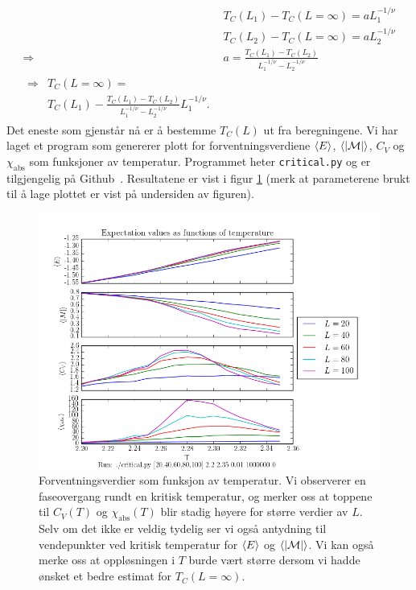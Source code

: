 \documentclass[11pt, twocolumn]{article}
\newcommand{\abs}[1]{|#1|}
\begin{document}
\begin{align}
  &T_C(L_1) - T_C(L=\infty) = aL_1^{-1/\nu}\\
  &T_C(L_2) - T_C(L=\infty) = aL_2^{-1/\nu}\\
\Rightarrow &a = \frac{ T_C(L_1) - T_C(L_2)} {L_1^{-1/\nu} -
  L_2^{-1/\nu}}\\
\begin{split}
\Rightarrow &T_C(L=\infty) = \\ &T_C(L_1) - \frac{ T_C(L_1) - T_C(L_2)} {L_1^{-1/\nu} -
  L_2^{-1/\nu}}L_1^{-1/\nu}\label{eq:Tc-inf-scale-expression}.
\end{split}
\end{align}
Det eneste som gjenstår nå er å bestemme $T_C(L)$ ut fra
beregningene. Vi har laget et program som genererer plott for
forventningsverdiene $\langle E \rangle$, $\mean{\abs{\mathcal{M}}}$, $C_V$ og
$\chi_\text{abs}$ som funksjoner av temperatur. Programmet heter
\texttt{critical.py} og er tilgjengelig på
Github~\cite{github-repo}. Resultatene er vist i figur \ref{fig:critical-plot} (merk at
parameterene brukt til å lage plottet er vist på undersiden av
figuren). 

\begin{figure}[ht]
  \centering
  \includegraphics[scale=0.7]{../fig/critical.png}
  \caption{\label{fig:critical-plot} Forventningsverdier som funksjon
    av temperatur. Vi observerer en faseovergang rundt en kritisk
    temperatur, og merker oss at toppene til $C_V(T)$ og
    $\chi_\text{abs}(T)$ blir stadig høyere for større verdier av
    $L$. Selv om det ikke er veldig tydelig ser vi også antydning til
    vendepunkter ved kritisk temperatur for $\langle E \rangle$ og
    $\langle |\mathcal{M}| \rangle$. Vi kan også merke oss at oppløsningen i
    $T$ burde vært større dersom vi hadde ønsket et bedre estimat for
    $T_C(L=\infty)$.}
\end{figure}
\end{document}

